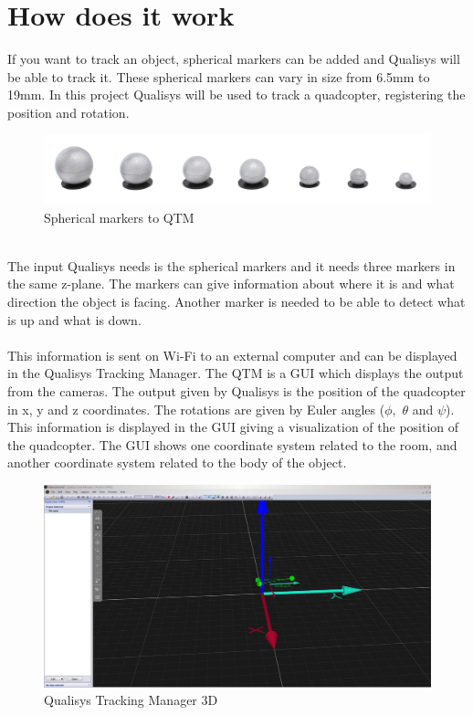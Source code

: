 \section*{How does it work}

If you want to track an object, spherical markers can be added and Qualisys will be able to track it. These spherical markers can vary in size from 6.5mm to 19mm. In this project Qualisys will be used to track a quadcopter, registering the position and rotation. \\
\begin{figure}[h]
          \centering
            \includegraphics[scale = 0.35]{VAPIQ-PICTURES/sphere.png}
                \caption{Spherical markers to QTM}
                \label{sphere}
            \label{dir}
\end{figure}
\\
The input Qualisys needs is the spherical markers and it needs three markers in the same z-plane. The markers can give information about where it is and what direction the object is facing. Another marker is needed to be able to detect what is up and what is down. \\
\\
This information is sent on Wi-Fi to an external computer and can be displayed in the Qualisys Tracking Manager. The QTM is a GUI which displays the output from the cameras. The output given by Qualisys is the position of the quadcopter in x, y and z coordinates. The rotations are given by Euler angles ($ \phi,$ $ \theta $ and $ \psi $).\\
This information is displayed in the GUI giving a visualization of the position of the quadcopter. The GUI shows one coordinate system related to the room, and another coordinate system related to the body of the object.
\begin{figure}[ht]
          \centering
            \includegraphics[scale = 0.25]{VAPIQ-PICTURES/qtm}
                \caption{Qualisys Tracking Manager 3D}
                \label{qtm3d}
            \label{dir}
\end{figure}
